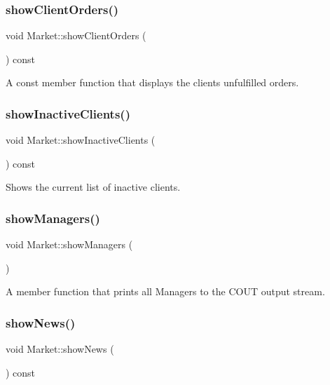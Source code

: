 \subsubsection{\texorpdfstring{show\+Client\+Orders()}{showClientOrders()}}
{\footnotesize\ttfamily void Market\+::show\+Client\+Orders (\begin{DoxyParamCaption}{ }\end{DoxyParamCaption}) const}

A const member function that displays the client\textquotesingle{}s unfulfilled orders. \hypertarget{class_market_ac61a075368b27b8beea8054cd66d8068}{}\label{class_market_ac61a075368b27b8beea8054cd66d8068} 
\subsubsection{\texorpdfstring{show\+Inactive\+Clients()}{showInactiveClients()}}
{\footnotesize\ttfamily void Market\+::show\+Inactive\+Clients (\begin{DoxyParamCaption}{ }\end{DoxyParamCaption}) const}

Shows the current list of inactive clients. \hypertarget{class_market_a5576cae65a6b9c2cea668246e1683b2e}{}\label{class_market_a5576cae65a6b9c2cea668246e1683b2e} 
\subsubsection{\texorpdfstring{show\+Managers()}{showManagers()}}
{\footnotesize\ttfamily void Market\+::show\+Managers (\begin{DoxyParamCaption}{ }\end{DoxyParamCaption})}

A member function that prints all Managers to the C\+O\+UT output stream. \hypertarget{class_market_aa6ebd2d116f126606ab2b7cd34fe8fc7}{}\label{class_market_aa6ebd2d116f126606ab2b7cd34fe8fc7} 
\subsubsection{\texorpdfstring{show\+News()}{showNews()}\hspace{0.1cm}{\footnotesize\ttfamily [1/4]}}
{\footnotesize\ttfamily void Market\+::show\+News (\begin{DoxyParamCaption}{ }\end{DoxyParamCaption}) const}

